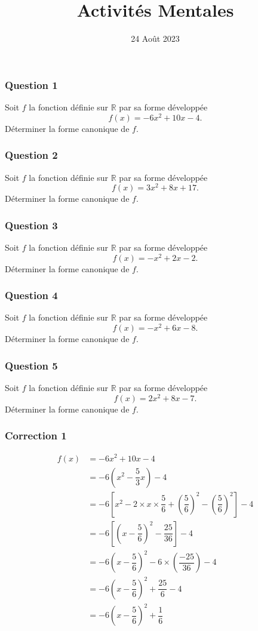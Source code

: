 \documentclass[15pt, mathserif]{beamer}
\title{Activités Mentales}
\date{24 Août 2023}
\begin{document}
\begin{frame}
    \titlepage
\end{frame}

\begin{frame} 
	\frametitle{Question 1}
Soit $f$ la fonction définie sur $\mathbb{R}$ par sa forme développée \[f(x) = -6x^2+10x-4.\] Déterminer la forme canonique de $f$.\end{frame}


\begin{frame} 
	\frametitle{Question 2}
Soit $f$ la fonction définie sur $\mathbb{R}$ par sa forme développée \[f(x) = 3x^2+8x+17.\] Déterminer la forme canonique de $f$.\end{frame}


\begin{frame} 
	\frametitle{Question 3}
Soit $f$ la fonction définie sur $\mathbb{R}$ par sa forme développée \[f(x) = -x^2+2x-2.\] Déterminer la forme canonique de $f$.\end{frame}


\begin{frame} 
	\frametitle{Question 4}
Soit $f$ la fonction définie sur $\mathbb{R}$ par sa forme développée \[f(x) = -x^2+6x-8.\] Déterminer la forme canonique de $f$.\end{frame}


\begin{frame} 
	\frametitle{Question 5}
Soit $f$ la fonction définie sur $\mathbb{R}$ par sa forme développée \[f(x) = 2x^2+8x-7.\] Déterminer la forme canonique de $f$.\end{frame}


\begin{frame}
\vspace{-10mm}
	\frametitle{Correction 1}
\begin{align*} f(x) &= -6x^2+10x-4\\ 
&=-6\left(x^2-\dfrac{5}{3}x\right)-4\\ 
&=-6\left[x^2-2\times x \times\dfrac{5}{6}+\left(\dfrac{5}{6}\right)^2- \left(\dfrac{5}{6}\right)^2\right]-4\\ 
&=-6\left[ \left( x-\dfrac{5}{6}\right)^2-\dfrac{25}{36}\right]-4\\ 
&=-6 \left( x-\dfrac{5}{6}\right)^2-6\times \left(\dfrac{-25}{36}\right)-4\\ 
&=-6 \left( x-\dfrac{5}{6}\right)^2+\dfrac{25}{6}-4\\ 
&=-6 \left( x-\dfrac{5}{6}\right)^2+\dfrac{1}{6}
 \end{align*} 

 \bigskip\end{frame}
\end{document}
